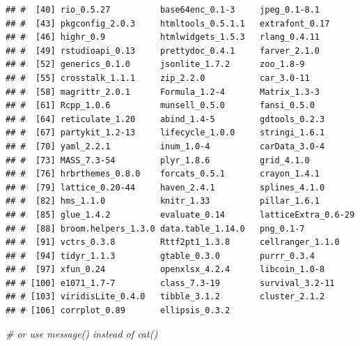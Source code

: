 \documentclass[
  12pt,
]{article}
\newenvironment{Shaded}{\begin{snugshade}}{\end{snugshade}}
\newcommand{\CommentTok}[1]{\textcolor[rgb]{0.56,0.35,0.01}{\textit{#1}}}
\begin{document}
\begin{verbatim}
## #  [40] rio_0.5.27          base64enc_0.1-3     jpeg_0.1-8.1        
## #  [43] pkgconfig_2.0.3     htmltools_0.5.1.1   extrafont_0.17      
## #  [46] highr_0.9           htmlwidgets_1.5.3   rlang_0.4.11        
## #  [49] rstudioapi_0.13     prettydoc_0.4.1     farver_2.1.0        
## #  [52] generics_0.1.0      jsonlite_1.7.2      zoo_1.8-9           
## #  [55] crosstalk_1.1.1     zip_2.2.0           car_3.0-11          
## #  [58] magrittr_2.0.1      Formula_1.2-4       Matrix_1.3-3        
## #  [61] Rcpp_1.0.6          munsell_0.5.0       fansi_0.5.0         
## #  [64] reticulate_1.20     abind_1.4-5         gdtools_0.2.3       
## #  [67] partykit_1.2-13     lifecycle_1.0.0     stringi_1.6.1       
## #  [70] yaml_2.2.1          inum_1.0-4          carData_3.0-4       
## #  [73] MASS_7.3-54         plyr_1.8.6          grid_4.1.0          
## #  [76] hrbrthemes_0.8.0    forcats_0.5.1       crayon_1.4.1        
## #  [79] lattice_0.20-44     haven_2.4.1         splines_4.1.0       
## #  [82] hms_1.1.0           knitr_1.33          pillar_1.6.1        
## #  [85] glue_1.4.2          evaluate_0.14       latticeExtra_0.6-29 
## #  [88] broom.helpers_1.3.0 data.table_1.14.0   png_0.1-7           
## #  [91] vctrs_0.3.8         Rttf2pt1_1.3.8      cellranger_1.1.0    
## #  [94] tidyr_1.1.3         gtable_0.3.0        purrr_0.3.4         
## #  [97] xfun_0.24           openxlsx_4.2.4      libcoin_1.0-8       
## # [100] e1071_1.7-7         class_7.3-19        survival_3.2-11     
## # [103] viridisLite_0.4.0   tibble_3.1.2        cluster_2.1.2       
## # [106] corrplot_0.89       ellipsis_0.3.2
\end{verbatim}

\begin{Shaded}
\begin{Highlighting}[]
  \CommentTok{\# or use message() instead of cat()}
\end{Highlighting}
\end{Shaded}
\end{document}
